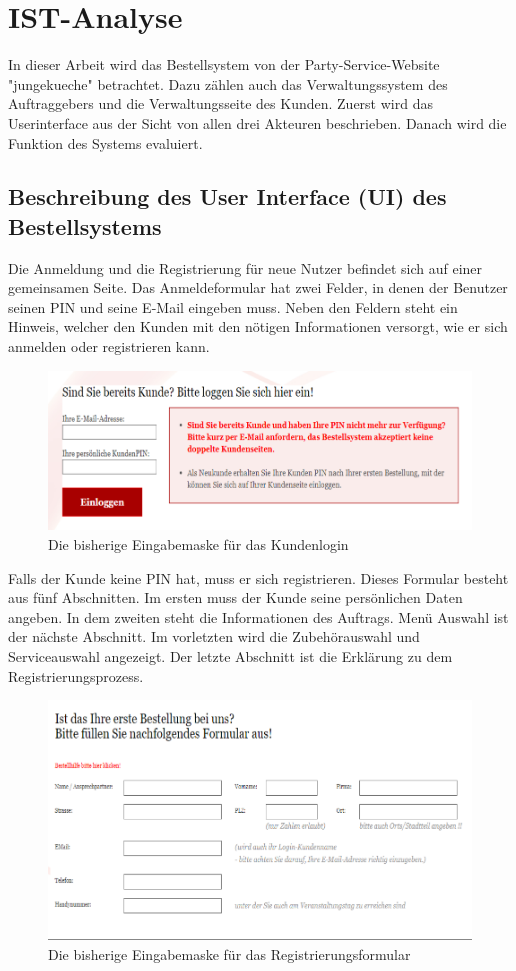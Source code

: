 \chapter{IST-Analyse}
In dieser Arbeit wird das Bestellsystem von der Party-Service-Website "jungekueche" betrachtet. Dazu zählen auch das Verwaltungssystem des Auftraggebers und die Verwaltungsseite des Kunden. Zuerst wird das Userinterface aus der Sicht von allen drei Akteuren beschrieben. Danach wird die Funktion des Systems evaluiert.

\section{Beschreibung des User Interface (UI) des Bestellsystems} 

Die Anmeldung und die Registrierung für neue Nutzer befindet sich auf einer gemeinsamen Seite. 
Das Anmeldeformular hat zwei Felder, in denen der Benutzer seinen PIN und seine E-Mail eingeben muss. Neben den Feldern steht ein Hinweis, welcher den Kunden mit den nötigen Informationen versorgt, wie er sich anmelden oder registrieren kann.  


\begin{figure}[h]
	\centering
	\includegraphics[width=0.7\linewidth]{Graphics/anmeldeformular.png}
	\caption[Anmeldeformular]{Die bisherige Eingabemaske für das Kundenlogin}
	\label{fig:anmeldeformular}
\end{figure}

Falls der Kunde keine PIN hat, muss er sich registrieren. Dieses Formular besteht aus fünf Abschnitten. Im ersten muss der Kunde seine persönlichen Daten angeben. In dem zweiten steht die Informationen des Auftrags. Menü Auswahl ist der nächste Abschnitt. Im vorletzten wird die Zubehörauswahl und Serviceauswahl angezeigt. Der letzte Abschnitt ist die Erklärung zu dem Registrierungsprozess. 

\begin{figure}
	\centering
	\includegraphics[width=0.7\linewidth]{Graphics/registerForm.png}
	\caption[Registerformular]{Die bisherige Eingabemaske für das Registrierungsformular}
	\label{fig:registerForm}
\end{figure}

